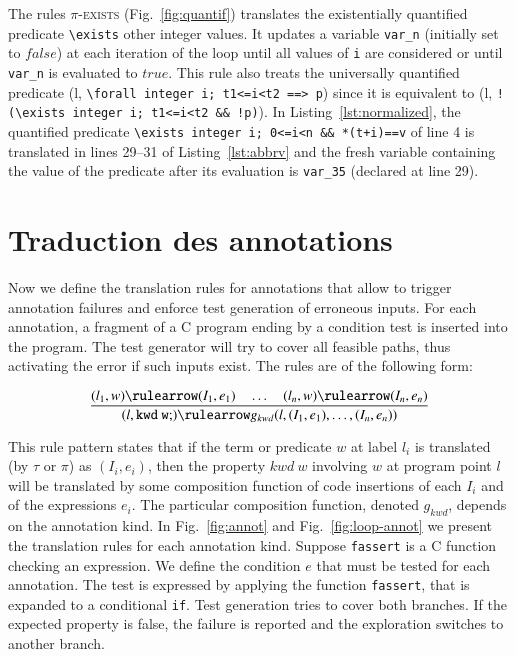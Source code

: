 The rules \textsc{$\pi$-exists}
(Fig.~\ref{fig:quantif}) translates the existentially
quantified predicate \lstinline|\exists| other integer values.
It updates
a variable \lstinline|var_n| (initially set to $false$) at each iteration of the
loop until all values of \lstinline|i| are considered or  
until \lstinline|var_n| is evaluated to $true$.
This rule also treats the universally quantified predicate
(l, \lstinline{\forall integer i; t1<=i<t2 ==> p}) since it
is equivalent to 
(l, \lstinline{! (\exists integer i; t1<=i<t2 && !p)}).
In Listing~\ref{lst:normalized}, the quantified predicate
\lstinline{\exists integer i; 0<=i<n && *(t+i)==v} of 
line 4 is translated in lines 29--31 of Listing~\ref{lst:abbrv}
and the fresh variable containing the value of the predicate after its
evaluation is \lstinline|var_35| (declared at line 29).


\section{Traduction des annotations \acsl}
\label{sec:annot}

Now we  define the translation rules for annotations that allow to trigger 
annotation failures and 
enforce 
test generation of erroneous inputs. For each annotation, a fragment of a C
program ending by a condition test is inserted into the program. The test
generator will try to cover all feasible paths, thus activating the error if
such inputs exist. The rules are of the following form:

\vspace{-4mm}
\[
\dfrac
    {(l_1, w) \rulearrow (I_1, e_1) \quad \ldots \quad
      (l_n, w) \rulearrow (I_n, e_n)}
    {(l, \mathtt{kwd\ w;}) \rulearrow
      g_{kwd} (l, (I_1, e_1), \ldots, (I_n, e_n))}
\]
\vspace{-4mm}





This rule pattern states that if the term or predicate $w$ at label $l_i$
is translated (by $\tau$ or $\pi$) as
$(I_i, e_i)$, then the property $kwd\ w$ involving $w$ at
program point $l$ will be translated by some composition 
function of code insertions of each
$I_i$ and of the expressions $e_i$. 
The particular composition function, denoted $g_{kwd}$, depends on
the annotation kind.
In Fig.~\ref{fig:annot} and Fig.~\ref{fig:loop-annot} we present the
translation rules for each annotation kind. Suppose \lstinline|fassert| is a C
function checking an expression. We define the condition $e$ that
must be tested for each annotation. The test is expressed by applying the
function \lstinline|fassert|, that is expanded to a conditional \lstinline|if|.
Test generation tries to cover both branches. If the expected property is
false, the failure is reported and the
exploration switches to another branch.

